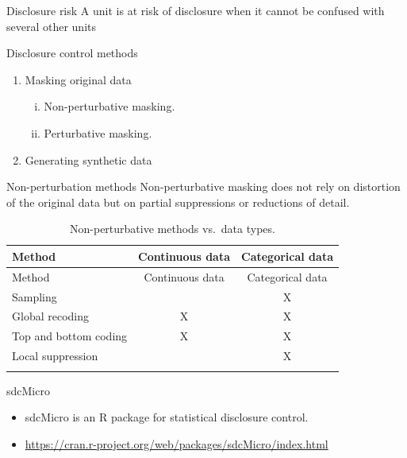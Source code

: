\documentclass[
  ignorenonframetext,
  aspectratio=169,
]{beamer}
\providecommand{\tightlist}{%
  \setlength{\itemsep}{0pt}\setlength{\parskip}{0pt}}\usepackage{longtable,booktabs,array}
\begin{document}
\begin{frame}{Disclosure risk}
\protect\hypertarget{disclosure-risk}{}
A unit is at risk of disclosure when it cannot be confused with several
other units
\end{frame}

\begin{frame}{Disclosure control methods}
\protect\hypertarget{disclosure-control-methods}{}
\begin{enumerate}
\tightlist
\item
  Masking original data

  \begin{enumerate}
  [i.]
  \tightlist
  \item
    Non-perturbative masking.
  \item
    Perturbative masking.
  \end{enumerate}
\item
  Generating synthetic data
\end{enumerate}
\end{frame}

\begin{frame}{Non-perturbation methods}
\protect\hypertarget{non-perturbation-methods}{}
Non-perturbative masking does not rely on distortion of the original
data but on partial suppressions or reductions of detail.

\begin{longtable}[]{@{}lcc@{}}
\caption{Non-perturbative methods vs.~data types.}\tabularnewline
\toprule\noalign{}
Method & Continuous data & Categorical data \\
\midrule\noalign{}
\endfirsthead
\toprule\noalign{}
Method & Continuous data & Categorical data \\
\midrule\noalign{}
\endhead
Sampling & & X \\
Global recoding & X & X \\
Top and bottom coding & X & X \\
Local suppression & & X \\
\bottomrule\noalign{}
\end{longtable}
\end{frame}

\begin{frame}{sdcMicro}
\protect\hypertarget{sdcmicro}{}
\begin{itemize}
\item
  sdcMicro is an R package for statistical disclosure control.
\item
  \url{https://cran.r-project.org/web/packages/sdcMicro/index.html}
\end{itemize}
\end{frame}
\end{document}
